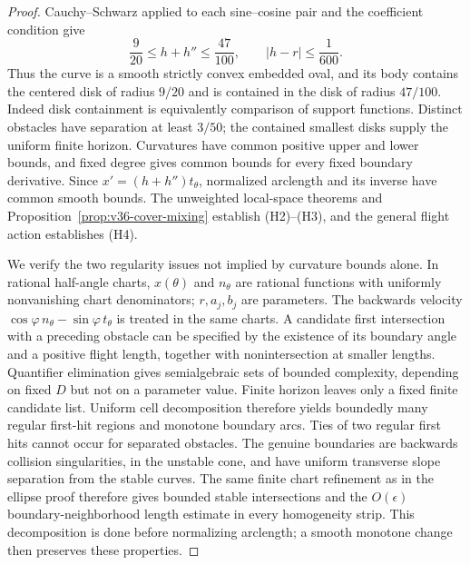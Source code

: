 \begin{proof}
Cauchy--Schwarz applied to each sine--cosine pair and the coefficient
condition give
\[
 \frac9{20}\le h+h''\le\frac{47}{100},\qquad
 |h-r|\le\frac1{600}.
\]
Thus the curve is a smooth strictly convex embedded oval, and its
body contains the centered disk of radius $9/20$ and is contained in
the disk of radius $47/100$. Indeed disk containment is equivalently
comparison of support functions. Distinct obstacles have separation
at least $3/50$; the contained smallest disks supply the uniform finite
horizon. Curvatures have common positive upper and lower bounds, and
fixed degree gives common bounds for every fixed boundary derivative.
Since $x'=(h+h'')t_\theta$, normalized arclength and its inverse have
common smooth bounds. The unweighted local-space theorems and
Proposition~\ref{prop:v36-cover-mixing} establish (H2)--(H3), and
the general flight action establishes (H4).

We verify the two regularity issues not implied by curvature bounds
alone. In rational half-angle charts, $x(\theta)$ and $n_\theta$ are
rational functions with uniformly nonvanishing chart denominators;
$r,a_j,b_j$ are parameters. The backwards velocity
$\cos\varphi\,n_\theta-\sin\varphi\,t_\theta$ is treated in the
same charts. A candidate first intersection with a preceding obstacle
can be specified by the existence of its boundary angle and a
positive flight length, together with nonintersection at smaller
lengths. Quantifier elimination gives semialgebraic sets of bounded
complexity, depending on fixed $D$ but not on a parameter value.
Finite horizon leaves only a fixed finite candidate list.
Uniform cell decomposition therefore yields boundedly many regular
first-hit regions and monotone boundary arcs. Ties of two regular
first hits cannot occur for separated obstacles. The genuine
boundaries are backwards collision singularities, in the unstable
cone, and have uniform transverse slope separation from the stable
curves. The same finite chart refinement as in the ellipse proof
therefore gives bounded stable intersections and the
$O(\epsilon)$ boundary-neighborhood length estimate in every
homogeneity strip. This decomposition is done before normalizing
arclength; a smooth monotone change then preserves these properties.


\end{proof}

